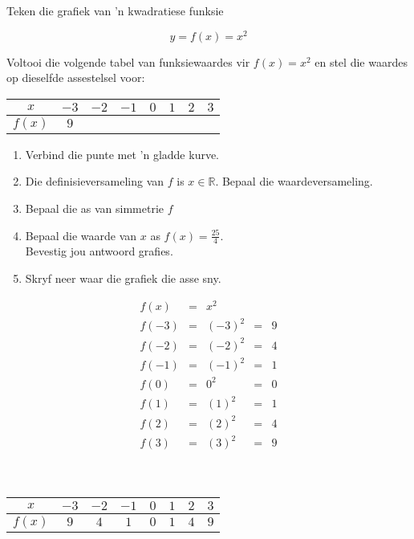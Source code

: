 \begin{wex}{Teken die grafiek van 'n kwadratiese funksie}
{
\begin{equation*}
 y = f(x) = x^{2}
\end{equation*}

Voltooi die volgende tabel van funksiewaardes vir $f(x)=x^{2}$ en stel die waardes op dieselfde assestelsel voor:
\\
\begin{center}
\begin{tabular}{|c|c|c|c|c|c|c|c|}
\hline
  $x$ &  $-3$ & $-2$ & $-1$ & $0$ & $1$ & $2$ & $3$
\\ \hline
 $f(x)$& $9$ &&&&&&
\\ \hline
\end{tabular}
\end{center}
\vspace{10pt}
\begin{enumerate}[noitemsep, label=\textbf{\arabic*}. ] 
 \item Verbind die punte met 'n gladde kurve.
\item Die definisieversameling van $f$ is $x \in \mathbb{R}$. Bepaal die waardeversameling.
\item Bepaal die as van simmetrie $f$
\item Bepaal die waarde van $x$ as $f(x) = \frac{25}{4}$. \\Bevestig jou antwoord grafies.
\item Skryf neer waar die grafiek die asse sny.
\end{enumerate}
}
{
\begin{equation*}
 \begin{array}{cclcc}
  f(x) &=& x^{2} & &\\
 f(-3) &=& (-3)^{2} &=& 9 \\ 
 f(-2) &=& (-2)^{2} &=& 4 \\
 f(-1) &=& (-1)^{2} &=& 1 \\
f(0) &=& 0^{2} &= &0 \\
f(1) &=& (1)^{2} &= &1 \\ 
f(2) &=& (2)^{2} &= &4 \\
f(3) &=& (3)^{2} &= &9
 \end{array}
\end{equation*}
\\
\\
\begin{center}
\begin{tabular}{|c|c|c|c|c|c|c|c|}
\hline
  $x$ &  $-3$ & $-2$ & $-1$ & $0$ & $1$ & $2$ & $3$
\\ \hline
 $f(x)$& $9$ &$4$&$1$&$0$&$1$&$4$&$9$
\\ \hline
\end{tabular}
\end{center}

}
\end{wex}
